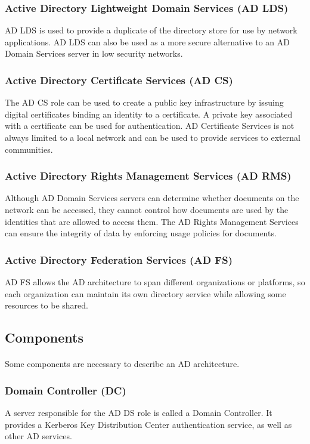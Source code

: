 \subsubsection{Active Directory Lightweight Domain Services (AD LDS)}
AD LDS is used to provide a duplicate of the directory store for use by network applications. AD LDS can also be used as a more secure alternative to an AD Domain Services server in low security networks.

\subsubsection{Active Directory Certificate Services (AD CS)}
The AD CS role can be used to create a public key infrastructure by issuing digital certificates binding an identity to a certificate. A private key associated with a certificate can be used for authentication. AD Certificate Services is not always limited to a local network and can be used to provide services to external communities.

\subsubsection{Active Directory Rights Management Services (AD RMS)}
Although AD Domain Services servers can determine whether documents on the network can be accessed, they cannot control how documents are used by the identities that are allowed to access them. The AD Rights Management Services can ensure the integrity of data by enforcing usage policies for documents.

\subsubsection{Active Directory Federation Services (AD FS)}
AD FS allows the AD architecture to span different organizations or platforms, so each organization can maintain its own directory service while allowing some resources to be shared.


\subsection{Components}
\paragraph{}
Some components are necessary to describe an AD architecture.

\subsubsection{Domain Controller (DC)}
A server responsible for the AD DS role is called a Domain Controller. It provides a Kerberos Key Distribution Center authentication service, as well as other AD services\cite[p. 9]{holme_self-paced_2011}.


